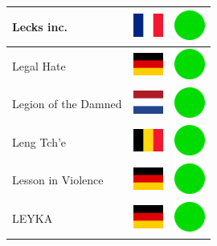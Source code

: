 \documentclass[12pt, a4paper, twoside]{report}
\begin{document}
\begin{center}
\begin{longtable}{|p{5cm}|p{2cm}|p{2cm}|}
 Lecks inc.                                                 & \includegraphics[width=1cm]{4x3/fr} &   \includegraphics[width=1cm]{likes/y} \\ \hline
 Legal Hate                                                 & \includegraphics[width=1cm]{4x3/de} &   \includegraphics[width=1cm]{likes/y} \\ \hline
 Legion of the Damned                                       & \includegraphics[width=1cm]{4x3/nl} &   \includegraphics[width=1cm]{likes/y} \\ \hline
 Leng Tch'e                                                 & \includegraphics[width=1cm]{4x3/be} &   \includegraphics[width=1cm]{likes/y} \\ \hline
 Lesson in Violence                                         & \includegraphics[width=1cm]{4x3/de} &   \includegraphics[width=1cm]{likes/y} \\ \hline
 LEYKA                                                      & \includegraphics[width=1cm]{4x3/de} &   \includegraphics[width=1cm]{likes/y} \\ \hline

\end{longtable}
\end{center}
\end{document}
